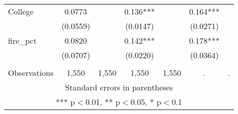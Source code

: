 \begin{tabular}{lcccccc}
College & 0.0773 &  & 0.136*** &  & 0.164*** &  \\
 & (0.0559) &  & (0.0147) &  & (0.0271) &  \\
fire\_pct & 0.0820 &  & 0.142*** &  & 0.178*** &  \\
 & (0.0707) &  & (0.0220) &  & (0.0364) &  \\
 &  &  &  &  &  &  \\
 Observations & 1,550 & 1,550 & 1,550 & 1,550 & . & . \\ \hline
\multicolumn{7}{c}{ Standard errors in parentheses} \\
\multicolumn{7}{c}{ *** p$<$0.01, ** p$<$0.05, * p$<$0.1} \\
\end{tabular}
